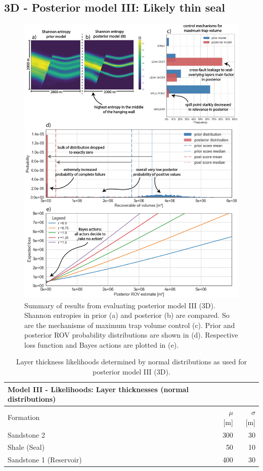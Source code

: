 		\subsection{3D - Posterior model III: Likely thin seal}%
		\begin{figure}[p!]
			\centering
			\includegraphics[width=1\textwidth]{Figures/ML2}
			\caption{Summary of results from evaluating posterior model III (3D). Shannon entropies in prior (a) and posterior (b) are compared. So are the mechanisms of maximum trap volume control (c). Prior and posterior ROV probability distributions are shown in (d). Respective loss function and Bayes actions are plotted in (e).}\label{fig:ML2}
		\end{figure}
		\begin{table}[h]
			\centering
			\begin{tabular}{lrr} 
				\toprule
				Model III - Likelihoods: Layer thicknesses (normal distributions)\\  
				\midrule 
				Formation & $\mu$ [m] & $\sigma$ [m]\\ 
				\midrule 
				Sandstone 2 & 300 & 30 \\
				Shale (Seal) & 50 & 10\\ 
				Sandstone 1 (Reservoir) & 400 & 30 \\
				\bottomrule
			\end{tabular}
			\caption{Layer thickness likelihoods determined by normal distributions as used for posterior model III (3D).}
			\label{tab:ML2_likelihoods}
		\end{table}
